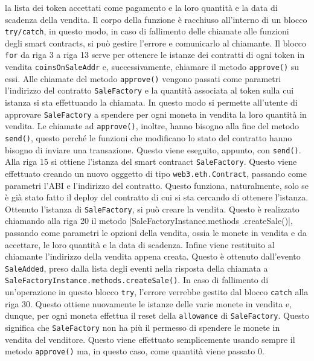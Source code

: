 \documentclass[a4paper]{article}
\begin{document}
        la lista dei token accettati come pagamento e la loro quantità e la data di scadenza della vendita.
        \newline
        Il corpo della funzione è racchiuso all'interno di un blocco \verb|try/catch|, in questo modo, in caso di fallimento delle chiamate alle funzioni degli smart contracts, si può gestire l'errore e comunicarlo al chiamante.
        \newline
        Il blocco \verb|for| da riga 3 a riga 13 serve per ottenere le istanze dei contratti di ogni token in vendita \verb|coinsOnSaleAddr| e, successivamente, chiamare il metodo \verb|approve()| su essi.
        Alle chiamate del metodo \verb|approve()| vengono passati come parametri l'indirizzo del contratto \verb|SaleFactory| e la quantità associata al token sulla cui istanza si sta effettuando la chiamata.
        In questo modo si permette all'utente di approvare \verb|SaleFactory| a spendere per ogni moneta in vendita la loro quantità in vendita.
        \newline
        Le chiamate ad \verb|approve()|, inoltre, hanno bisogno alla fine del metodo \verb|send()|,
        questo perché le funzioni che modificano lo stato del contratto hanno bisogno di inviare una transazione. Questo viene eseguito, appunto, con \verb|send()|\cite{soliditysend}.
        \newline
        Alla riga 15 si ottiene l'istanza del smart contraact \verb|SaleFactory|. Questo viene effettuato creando un nuovo ogggetto di tipo \verb|web3.eth.Contract|, passando come parametri l'ABI e l'indirizzo del contratto.
        Questo funziona, naturalmente, solo se è già stato fatto il deploy del contratto di cui si sta cercando di ottenere l'istanza.
        \newline
        Ottenuto l'istanza di \verb|SaleFactory|, si può creare la vendita. Questo è realizzato chiamando alla riga 20 il metodo \spverb|SaleFactoryInstance.methods .createSale()|, passando come parametri le opzioni della vendita,
        ossia le monete in vendita e da accettare, le loro quantità e la data di scadenza.
        \newline
        Infine viene restituito al chiamante l'indirizzo della vendita appena creata. Questo è ottenuto dall'evento \verb|SaleAdded|, preso dalla lista degli eventi nella risposta della chiamata a \verb|SaleFactoryInstance.methods.createSale()|.
        \newline
        In caso di fallimento di un'operazione in questo blocco \verb|try|, l'errore verrebbe gestito dal blocco \verb|catch| alla riga 30. Questo ottiene nuovamente le istanze delle varie monete in vendita e, dunque, per ogni moneta effettua il reset della
        \verb|allowance| di \verb|SaleFactory|. Questo significa che \verb|SaleFactory| non ha più il permesso di spendere le monete in vendita del venditore. Questo viene effettuato semplicemente usando sempre il metodo \verb|approve()| ma, in questo caso,
        come quantità viene passato 0.
\end{document}
